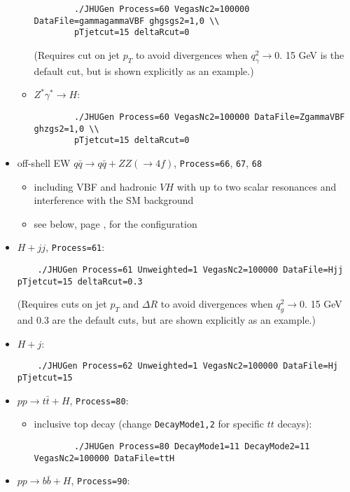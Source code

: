 \documentclass[aps,superscriptaddress,nofootinbib]{revtex4}
\begin{document}
\begin{itemize}
\begin{itemize}
		\begin{verbatim}
		./JHUGen Process=60 VegasNc2=100000 DataFile=gammagammaVBF ghgsgs2=1,0 \\
		pTjetcut=15 deltaRcut=0
		\end{verbatim}
		(Requires cut on jet $p_T$ to avoid divergences when $q_\gamma^2\to 0$.  15 GeV is the default cut, but is shown explicitly as an example.)
		\item $Z^*\gamma^*\to H$:
		\begin{verbatim}
		./JHUGen Process=60 VegasNc2=100000 DataFile=ZgammaVBF ghzgs2=1,0 \\
		pTjetcut=15 deltaRcut=0
		\end{verbatim}
	\end{itemize}
	\item off-shell EW $q \bar{q} \to q \bar{q} + ZZ(\to 4f)$, \texttt{Process=66}, \texttt{67}, \texttt{68} 
	\begin{itemize}
		\item including VBF and hadronic $VH$ with up to two scalar resonances and interference with the SM background
		\item see below, page \pageref{sec:offshell}, for the configuration
	\end{itemize}
	\item $H+jj$, \texttt{Process=61}:
	\begin{verbatim}
	./JHUGen Process=61 Unweighted=1 VegasNc2=100000 DataFile=Hjj pTjetcut=15 deltaRcut=0.3
	\end{verbatim}
	(Requires cuts on jet $p_T$ and $\Delta R$ to avoid divergences when $q_g^2\to 0$.  15 GeV and 0.3 are the default cuts, but are shown explicitly as an example.)
	\item $H+j$:
	\begin{verbatim}
	./JHUGen Process=62 Unweighted=1 VegasNc2=100000 DataFile=Hj pTjetcut=15
	\end{verbatim}
	\item $pp \to t\bar{t}+H$, \texttt{Process=80}:
	\begin{itemize}
		\item inclusive top decay (change \verb|DecayMode1,2| for specific $tt$ decays):
		\begin{verbatim}
		./JHUGen Process=80 DecayMode1=11 DecayMode2=11 VegasNc2=100000 DataFile=ttH
		\end{verbatim}
	\end{itemize}
	\item $pp \to b\bar{b}+H$, \texttt{Process=90}:
	\begin{verbatim}

\end{verbatim}
\end{itemize}
\end{document}
